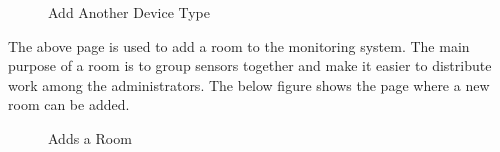 \documentclass{report}
\begin{document}
\begin{figure}[H]
	\caption{Add Another Device Type}
\end{figure}
\indent
The above page is used to add a room to the monitoring system. The main purpose of a room is to group sensors together and make it easier to distribute work among the administrators.
\newline
\indent
The below figure shows the page where a new room can be added.
\begin{figure}[H]
	\caption{Adds a Room}
\end{figure}
\newpage
\end{document}
